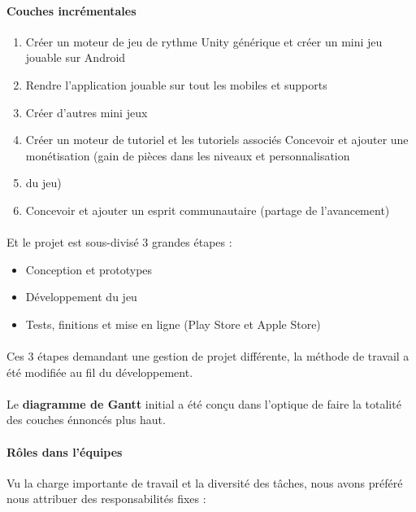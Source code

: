 \paragraph{Couches incrémentales}
\begin{enumerate}
\item Créer un moteur de jeu de rythme Unity générique et créer un mini jeu jouable sur Android
\item Rendre l’application jouable sur tout les mobiles et supports
\item Créer d’autres mini jeux
\item Créer un moteur de tutoriel et les tutoriels associés
Concevoir et ajouter une monétisation (gain de pièces dans les niveaux et personnalisation \item du jeu)
\item Concevoir et ajouter un esprit communautaire (partage de l’avancement)
\end{enumerate}

\paragraph{}
Et le projet est sous-divisé 3 grandes étapes :
\begin{itemize}
\item Conception et prototypes
\item Développement du jeu
\item Tests, finitions et mise en ligne (Play Store et Apple Store)
\end{itemize}

\paragraph{}
Ces 3 étapes demandant une gestion de projet différente, la méthode de travail a été modifiée au fil du développement.

\paragraph{}
Le \textbf{diagramme de Gantt} initial a été conçu dans l’optique de faire la totalité des couches énnoncés plus haut.

\paragraph{Rôles dans l’équipes}
Vu la charge importante de travail et la diversité des tâches, nous avons préféré nous attribuer des responsabilités fixes :


